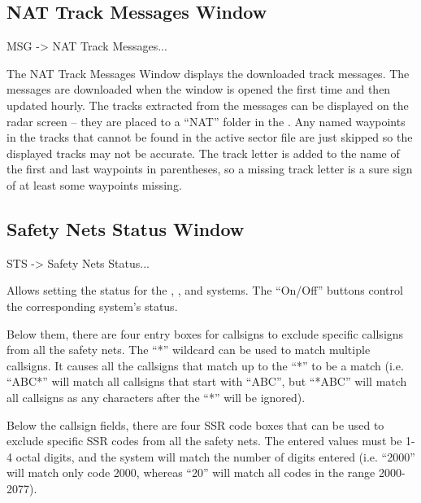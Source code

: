 \documentclass[a4paper,oneside,11pt]{memoir}
\begin{document}
\subsection{NAT Track Messages Window}
\label{win:nattmw}

 MSG -> NAT Track Messages...

\bigskip


The NAT Track Messages Window displays the downloaded track messages. The messages are downloaded when the window is opened the first time and then updated hourly. The tracks extracted from the messages can be displayed on the radar screen – they are placed to a “NAT” folder in the . Any named waypoints in the tracks that cannot be found in the active sector file are just skipped so the displayed tracks may not be accurate. The track letter is added to the name of the first and last waypoints in parentheses, so a missing track letter is a sure sign of at least some waypoints missing.

\subsection{Safety Nets Status Window}
\label{win:snsw}

 STS -> Safety Nets Status...

\bigskip


Allows setting the status for the , ,  and  systems. The “On/Off” buttons control the corresponding system’s status.

\bigskip

Below them, there are four entry boxes for callsigns to exclude specific callsigns from all the safety nets. The “*” wildcard can be used to match multiple callsigns. It causes all the callsigns that match up to the “*” to be a match (i.e. “ABC*” will match all callsigns that start with “ABC”, but “*ABC” will match all callsigns as any characters after the “*” will be ignored).

\bigskip

Below the callsign fields, there are four SSR code boxes that can be used to exclude specific SSR codes from all the safety nets. The entered values must be 1-4 octal digits, and the system will match the number of digits entered (i.e. “2000” will match only code 2000, whereas “20” will match all codes in the range 2000-2077).
\end{document}
